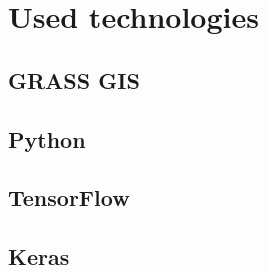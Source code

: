 \chapter{Used technologies}
\label{technologies}

\section{GRASS GIS}
\label{grass}

\section{Python}
\label{python}

\section{TensorFlow}
\label{tf}

\section{Keras}
\label{keras}